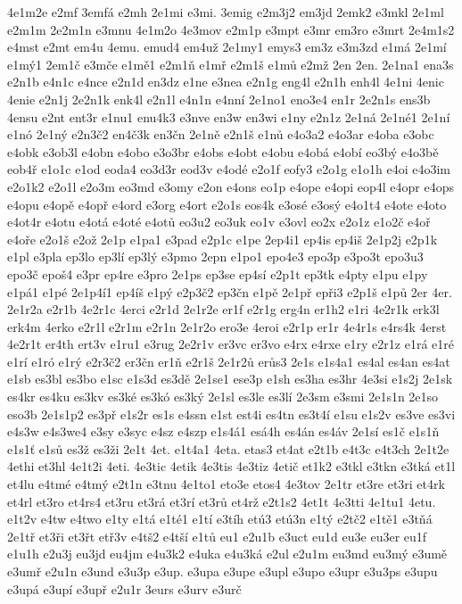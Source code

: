 {4e1m2e
e2mf
3emfá
e2mh
2e1mi
e3mi.
3emig
e2m3j2
em3jd
2emk2
e3mkl
2e1ml
e2m1m
2e2m1n
e3mnu
4e1m2o
4e3mov
e2m1p
e3mpt
e3mr
em3ro
e3mrt
2e4m1s2
e4mst
e2mt
em4u
4emu.
emud4
em4už
2e1my1
emys3
em3z
e3m3zd
e1má
2e1mí
e1mý1
2em1č
e3mče
e1mě1
e2m1ň
e1mř
e2m1š
e1mů
e2mž
2en
2en.
2e1na1
ena3s
e2n1b
e4n1c
e4nce
e2n1d
en3dz
e1ne
e3nea
e2n1g
eng4l
e2n1h
enh4l
4e1ni
4enic
4enie
e2n1j
2e2n1k
enk4l
e2n1l
e4n1n
e4nní
2e1no1
eno3e4
en1r
2e2n1s
ens3b
4ensu
e2nt
ent3r
e1nu1
enu4k3
e3nve
en3w
en3wi
e1ny
e2n1z
2e1ná
2e1né1
2e1ní
e1nó
2e1ný
e2n3č2
en4č3k
en3čn
2e1ně
e2n1š
e1nů
e4o3a2
e4o3ar
e4oba
e3obc
e4obk
e3ob3l
e4obn
e4obo
e3o3br
e4obs
e4obt
e4obu
e4obá
e4obí
eo3bý
e4o3bě
eob4ř
e1o1c
e1od
eoda4
eo3d3r
eod3v
e4odé
e2o1f
eofy3
e2o1g
e1o1h
e4oi
e4o3im
e2o1k2
e2o1l
e2o3m
eo3md
e3omy
e2on
e4ons
eo1p
e4ope
e4opi
eop4l
e4opr
e4ops
e4opu
e4opě
e4opř
e4ord
e3org
e4ort
e2o1s
eos4k
e3osé
e3osý
e4o1t4
e4ote
e4oto
e4ot4r
e4otu
e4otá
e4oté
e4otů
eo3u2
eo3uk
eo1v
e3ovl
eo2x
e2o1z
e1o2č
e4oř
e4oře
e2o1š
e2ož
2e1p
e1pa1
e3pad
e2p1c
e1pe
2ep4i1
ep4is
ep4iš
2e1p2j
e2p1k
e1pl
e3pla
ep3lo
ep3lí
ep3lý
e3pmo
2epn
e1po1
epo4e3
epo3p
e3po3t
epo3u3
epo3č
epoš4
e3pr
ep4re
e3pro
2e1ps
ep3se
ep4sí
e2p1t
ep3tk
e4pty
e1pu
e1py
e1pá1
e1pé
2e1p4í1
ep4íš
e1pý
e2p3č2
ep3čn
e1pě
2e1př
epři3
e2p1š
e1pů
2er
4er.
2e1r2a
e2r1b
4e2r1c
4erci
e2r1d
2e1r2e
er1f
e2r1g
erg4n
er1h2
e1ri
4e2r1k
erk3l
erk4m
4erko
e2r1l
e2r1m
e2r1n
2e1r2o
ero3e
4eroi
e2r1p
er1r
4e4r1s
e4rs4k
4erst
4e2r1t
er4th
ert3v
e1ru1
e3rug
2e2r1v
er3vc
er3vo
e4rx
e4rxe
e1ry
e2r1z
e1rá
e1ré
e1rí
e1ró
e1rý
e2r3č2
er3čn
er1ň
e2r1š
2e1r2ů
erůs3
2e1s
e1s4a1
es4al
es4an
es4at
e1sb
es3bl
es3bo
e1sc
e1s3d
es3dě
2e1se1
ese3p
e1sh
es3ha
es3hr
4e3si
e1s2j
2e1sk
es4kr
es4ku
es3kv
es3ké
es3kó
es3ký
2e1sl
es3le
es3lí
2e3sm
e3smi
2e1s1n
2e1so
eso3b
2e1s1p2
es3př
e1s2r
es1s
e4ssn
e1st
est4i
es4tn
es3t4í
e1su
e1s2v
es3ve
es3vi
e4s3w
e4s3we4
e3sy
e3syc
e4sz
e4szp
e1s4á1
esá4h
es4án
es4áv
2e1sí
es1č
e1s1ň
e1s1ť
e1sů
es3ž
es3ži
2e1t
4et.
e1t4a1
4eta.
etas3
et4at
e2t1b
e4t3c
e4t3ch
2e1t2e
4ethi
et3hl
4e1t2i
4eti.
4e3tic
4etik
4e3tis
4e3tiz
4etič
et1k2
e3tkl
e3tkn
e3tká
et1l
et4lu
e4tmé
e4tmý
e2t1n
e3tnu
4e1to1
eto3e
etos4
4e3tov
2e1tr
et3re
et3ri
et4rk
et4rl
et3ro
et4rs4
et3ru
et3rá
et3rí
et3rů
et4rž
e2t1s2
4et1t
4e3tti
4e1tu1
4etu.
e1t2v
e4tw
e4two
e1ty
e1tá
e1té1
e1tí
e3tíh
etú3
etú3n
e1tý
e2tč2
e1tě1
e3tňá
2e1tř
et3ři
et3řt
etř3v
e4tš2
e4tší
e1tů
eu1
e2u1b
e3uct
eu1d
eu3e
eu3er
eu1f
e1u1h
e2u3j
eu3jd
eu4jm
e4u3k2
e4uka
e4u3ká
e2ul
e2u1m
eu3md
eu3mý
e3umě
e3umř
e2u1n
e3und
e3u3p
e3up.
e3upa
e3upe
e3upl
e3upo
e3upr
e3u3ps
e3upu
e3upá
e3upí
e3upř
e2u1r
3eurs
e3urv
e3urč
}
